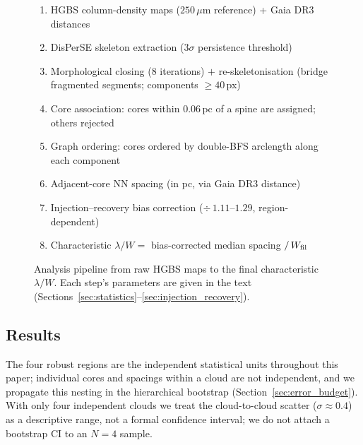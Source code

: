 \documentclass[usenatbib,twoside,twocolumn]{mnras}
\begin{document}
\begin{figure}
\centering
\begin{minipage}{0.95\columnwidth}
\footnotesize
\begin{enumerate}\setlength{\itemsep}{2pt}
\item HGBS column-density maps ($250\,\mu$m reference) + Gaia DR3 distances
\item DisPerSE skeleton extraction ($3\sigma$ persistence threshold)
\item Morphological closing (8 iterations) $+$ re-skeletonisation (bridge fragmented segments; components $\geq40$\,px)
\item Core association: cores within $0.06$\,pc of a spine are assigned; others rejected
\item Graph ordering: cores ordered by double-BFS arclength along each component
\item Adjacent-core NN spacing (in pc, via Gaia DR3 distance)
\item Injection--recovery bias correction ($\div\,1.11$--$1.29$, region-dependent)
\item Characteristic $\lambda/W = $ bias-corrected median spacing $/\,W_{\rm fil}$
\end{enumerate}
\end{minipage}
\caption{Analysis pipeline from raw HGBS maps to the final characteristic $\lambda/W$. Each step's parameters are given in the text (Sections~\ref{sec:statistics}--\ref{sec:injection_recovery}).}
\label{fig:pipeline}
\end{figure}

\subsection{Results}

The four robust regions are the independent statistical units throughout this paper; individual cores and spacings within a cloud are not independent, and we propagate this nesting in the hierarchical bootstrap (Section~\ref{sec:error_budget}). With only four independent clouds we treat the cloud-to-cloud scatter ($\sigma\approx0.4$) as a descriptive range, not a formal confidence interval; we do not attach a bootstrap CI to an $N=4$ sample.
\end{document}
